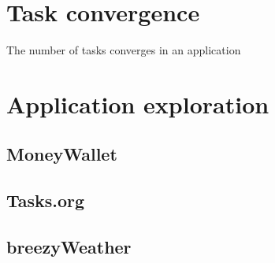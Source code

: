 \section{Task convergence}\label{task-convergence}

The number of tasks converges in an application

\section{Application exploration}\label{application-exploration}

\subsection{MoneyWallet}\label{moneywallet}

\subsection{Tasks.org}\label{tasks.org}

\subsection{breezyWeather}\label{breezyweather}
